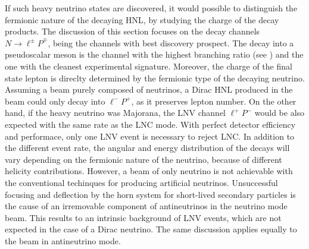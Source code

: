 If such heavy neutrino states are discovered, it would possible to distinguish the fermionic nature %
of the decaying HNL, by studying the charge of the decay products.
The discussion of this section focuses on the decay channels $N \to \ell^\pm P^\mp$, %
being the channels with best discovery prospect.
The decay into a pseudoscalar meson is the channel with the highest branching ratio (see ) %
and the one with the cleanest experimental signature.
Moreover, the charge of the final state lepton is direclty determined by the fermionic type of the decaying neutrino.
Assuming a beam purely composed of neutrinos, a Dirac HNL produced in the beam could only decay into $\ell^- P^+$, %
as it preserves lepton number.
On the other hand, if the heavy neutrino was Majorana, the LNV channel $\ell^+ P^-$ %
would be also expected with the same rate as the LNC mode.
With perfect detector efficiency and performace, only one LNV event is necessary to reject LNC.
In addition to the different event rate, the angular and energy distribution of the decays will vary %
depending on the fermionic nature of the neutrino, because of different helicity contributions.
However, a beam of only neutrino is not achievable with %
the conventional techinques for producing artificial neutrinos.
Unsuccessful focusing and deflection by the horn system for short-lived secondary particles is the cause %
of an irremovable component of antineutrinos in the neutrino mode beam. %
This results to an intrinsic background of LNV events, which are not expected in the case of a Dirac neutrino.
The same discussion applies equally to the beam in antineutrino mode.


